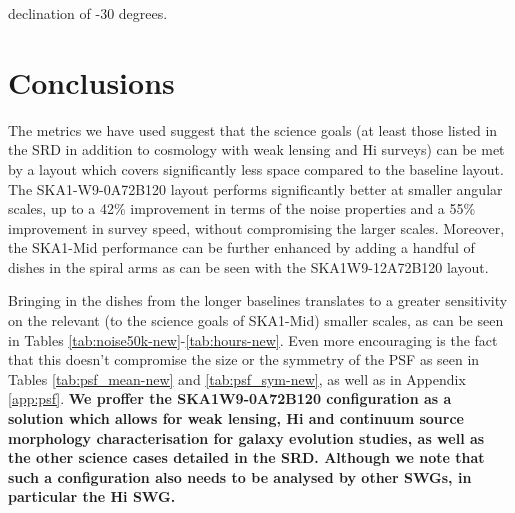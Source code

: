 \documentclass[sfheadings,a4paper,times,9pt,floats,floatfix]{article}
\begin{document}
declination of -30 degrees.
\begin{landscape}

\end{landscape}
\begin{landscape}
 
\end{landscape}
\begin{landscape}
 
\end{landscape}
\begin{landscape}
 
\end{landscape}
\begin{landscape}
 
\end{landscape}
\begin{landscape}

\end{landscape}
\begin{landscape}
 
\end{landscape}


\begin{landscape}
 
\end{landscape}

\section{Conclusions}\label{sec:conclusion}
The metrics we have used suggest that the science goals (at least those listed in the SRD in addition to cosmology with weak
lensing and H{\sc i} surveys) can be met by a layout which covers significantly less space compared to the baseline layout. The
SKA1-W9-0A72B120 layout performs significantly better at smaller angular scales, up to a 42\% improvement in terms of the noise
properties and a 55\% improvement in survey speed, without compromising the larger scales. Moreover, the SKA1-Mid performance can
be further enhanced by adding a handful of dishes in the spiral arms as can be seen
with the SKA1W9-12A72B120 layout.

Bringing in the dishes from the longer baselines translates to a greater sensitivity on the relevant (to the
science goals of SKA1-Mid) smaller scales, as can be seen in Tables \ref{tab:noise50k-new}-\ref{tab:hours-new}. Even
more encouraging is
the fact that this doesn't compromise the size or the symmetry of the PSF as seen in Tables \ref{tab:psf_mean-new} and
\ref{tab:psf_sym-new}, as well as in Appendix \ref{app:psf}. {\bf We proffer the SKA1W9-0A72B120 configuration as a solution
which allows for weak lensing, H{\sc i}
and continuum source morphology characterisation for galaxy evolution studies, as well as the other science cases detailed in the
SRD. Although we note that such a configuration also needs to be analysed by other SWGs, in particular the H{\sc i} SWG.}
\end{document}
